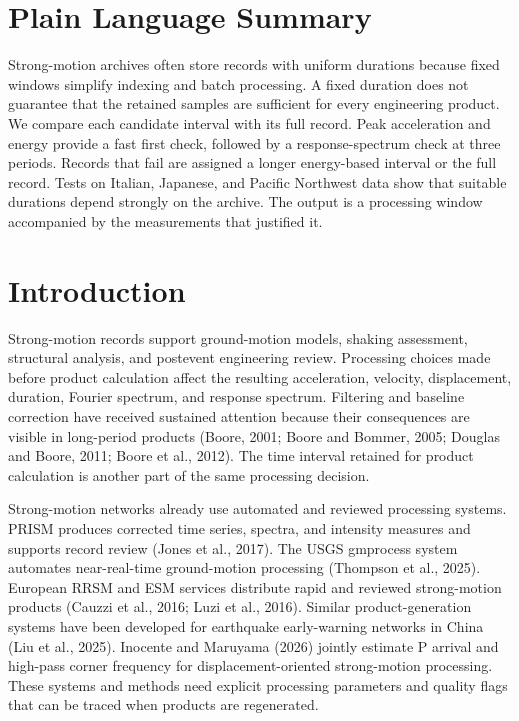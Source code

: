 \documentclass[12pt,letterpaper]{article}
\begin{document}
\section{Plain Language Summary}\label{plain-language-summary}

Strong-motion archives often store records with uniform durations because fixed windows simplify indexing and batch processing. A fixed duration does not guarantee that the retained samples are sufficient for every engineering product. We compare each candidate interval with its full record. Peak acceleration and energy provide a fast first check, followed by a response-spectrum check at three periods. Records that fail are assigned a longer energy-based interval or the full record. Tests on Italian, Japanese, and Pacific Northwest data show that suitable durations depend strongly on the archive. The output is a processing window accompanied by the measurements that justified it.

\section{Introduction}\label{introduction}

Strong-motion records support ground-motion models, shaking assessment, structural analysis, and postevent engineering review. Processing choices made before product calculation affect the resulting acceleration, velocity, displacement, duration, Fourier spectrum, and response spectrum. Filtering and baseline correction have received sustained attention because their consequences are visible in long-period products (Boore, 2001; Boore and Bommer, 2005; Douglas and Boore, 2011; Boore et al., 2012). The time interval retained for product calculation is another part of the same processing decision.

Strong-motion networks already use automated and reviewed processing systems. PRISM produces corrected time series, spectra, and intensity measures and supports record review (Jones et al., 2017). The USGS gmprocess system automates near-real-time ground-motion processing (Thompson et al., 2025). European RRSM and ESM services distribute rapid and reviewed strong-motion products (Cauzzi et al., 2016; Luzi et al., 2016). Similar product-generation systems have been developed for earthquake early-warning networks in China (Liu et al., 2025). Inocente and Maruyama (2026) jointly estimate P arrival and high-pass corner frequency for displacement-oriented strong-motion processing. These systems and methods need explicit processing parameters and quality flags that can be traced when products are regenerated.
\end{document}
